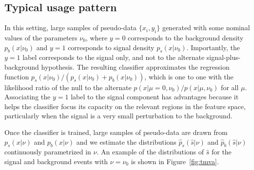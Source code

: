 \documentclass[aoas,preprint]{imsart}
\newcommand{\citek}[1]{[\cite{#1}]}
\numberwithin{equation}{section}
\theoremstyle{plain}
\begin{document}

\subsection{Typical usage pattern}

In this setting, large samples of pseudo-data $\{x_i, y_i\}$ generated with some nominal values of the parameters $\nu_0$, where $y=0$ corresponds to the background density $p_b(x|\nu_0)$  and $y=1$ corresponds to signal density $p_s(x|\nu_0)$. Importantly, the $y=1$ label corresponds to the signal only, and not to the alternate signal-plus-background hypothesis. The resulting classifier approximates the regression function $p_s(x|\nu_0)/(p_s(x|\nu_0)+p_b(x|\nu_0))$, which is one to one with the likelihood ratio of the null to the alternate $p(x|\mu=0,\nu_0)/p(x|\mu,\nu_0)$ for all $\mu$. Associating the $y=1$ label to the signal component has advantages because it helps the classifier focus its capacity on the relevant regions in the feature space, particularly when the signal is a very small perturbation to the background. 

 Once the classifier is trained, large samples of pseudo-data are drawn from $p_s(x | \nu)$ and $p_b(x | \nu)$ and we estimate the distributions  $\hat{p}_s(\hat s | \nu)$ and $\hat{p}_b(\hat s | \nu)$ continuously parametrized in $\nu$. 
An example of the distributions of $\hat s$ for the signal and background events with $\nu=\nu_0$ is shown in Figure~\ref{fig:tmva}.
\end{document}
